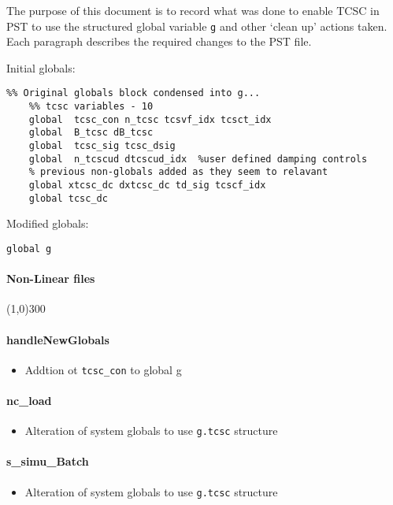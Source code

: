 \documentclass[12pt]{article}
\begin{document}
The purpose of this document is to record what was done to enable TCSC in PST to use the structured global variable \verb|g| and other `clean up' actions taken. \\
Each paragraph describes the required changes to the PST file.

Initial globals:
\begin{verbatim}
%% Original globals block condensed into g...
    %% tcsc variables - 10
    global  tcsc_con n_tcsc tcsvf_idx tcsct_idx
    global  B_tcsc dB_tcsc
    global  tcsc_sig tcsc_dsig
    global  n_tcscud dtcscud_idx  %user defined damping controls
	% previous non-globals added as they seem to relavant
	global xtcsc_dc dxtcsc_dc td_sig tcscf_idx 
    global tcsc_dc

\end{verbatim}

Modified globals:
\begin{verbatim}
global g
\end{verbatim}
\paragraph{Non-Linear files}\line(1,0){300}
\paragraph{handleNewGlobals}
	\begin{itemize}
		\item Addtion ot \verb|tcsc_con| to global g
	\end{itemize}

\paragraph{nc\_load}
	\begin{itemize}
		\item Alteration of system globals to use \verb|g.tcsc| structure
	\end{itemize}
	
\paragraph{s\_simu\_Batch}
	\begin{itemize}
		\item Alteration of system globals to use \verb|g.tcsc| structure
	\end{itemize}
	
\end{document}
